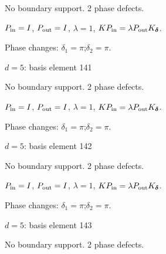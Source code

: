 No boundary support. 2 phase defects.
\begin{center}
\end{center}
\vspace{-1mm}
$P_{\rm in}=I$, \quad $P_{\rm out}=I$, \quad $\lambda=1$, \qquad $K P_{\rm in}=\lambda P_{\rm out}K_{\boldsymbol\delta}$.
\par\smallskip\begin{minipage}{.98\linewidth}\small Phase changes: $\delta_{1}=\pi$;\quad $\delta_{2}=\pi$.\end{minipage}
\vfill
{\footnotesize\texttt{}}
\newpage
{}
{\Large $d=5$: basis element 141}\par
No boundary support. 2 phase defects.
\begin{center}
\end{center}
\vspace{-1mm}
$P_{\rm in}=I$, \quad $P_{\rm out}=I$, \quad $\lambda=1$, \qquad $K P_{\rm in}=\lambda P_{\rm out}K_{\boldsymbol\delta}$.
\par\smallskip\begin{minipage}{.98\linewidth}\small Phase changes: $\delta_{1}=\pi$;\quad $\delta_{2}=\pi$.\end{minipage}
\vfill
{\footnotesize\texttt{}}
\newpage
{}
{\Large $d=5$: basis element 142}\par
No boundary support. 2 phase defects.
\begin{center}
\end{center}
\vspace{-1mm}
$P_{\rm in}=I$, \quad $P_{\rm out}=I$, \quad $\lambda=1$, \qquad $K P_{\rm in}=\lambda P_{\rm out}K_{\boldsymbol\delta}$.
\par\smallskip\begin{minipage}{.98\linewidth}\small Phase changes: $\delta_{1}=\pi$;\quad $\delta_{2}=\pi$.\end{minipage}
\vfill
{\footnotesize\texttt{}}
\newpage
{}
{\Large $d=5$: basis element 143}\par
No boundary support. 2 phase defects.
\begin{center}
\end{center}
